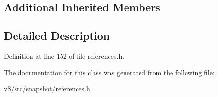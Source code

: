 \subsection*{Additional Inherited Members}


\subsection{Detailed Description}


Definition at line 152 of file references.\+h.



The documentation for this class was generated from the following file\+:\begin{DoxyCompactItemize}
\item 
v8/src/snapshot/references.\+h\end{DoxyCompactItemize}
